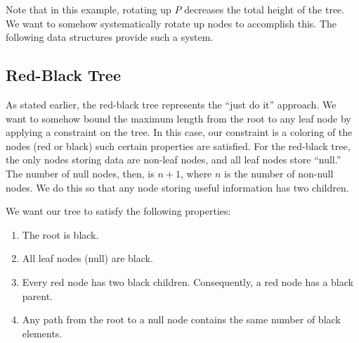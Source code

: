 \documentclass[11pt]{book}
\begin{document}
Note that in this example, rotating up $P$ decreases the total height of the tree. We want to somehow systematically rotate up nodes to accomplish this. The following data structures provide such a system.

\subsection{Red-Black Tree}

As stated earlier, the red-black tree represents the ``just do it'' approach. We want to somehow bound the maximum length from the root to any leaf node by applying a constraint on the tree. In this case, our constraint is a coloring of the nodes (red or black) such certain properties are satisfied. For the red-black tree, the only nodes storing data are non-leaf nodes, and all leaf nodes store ``null.'' The number of null nodes, then, is $n+1$, where $n$ is the number of non-null nodes. We do this so that any node storing useful information has two children.

We want our tree to satisfy the following properties:

\begin{enumerate}

\item
The root is black.

\item
All leaf nodes (null) are black.

\item
Every red node has two black children. Consequently, a red node has a black parent.

\item
Any path from the root to a null node contains the same number of black elements.

\end{enumerate}
\end{document}
